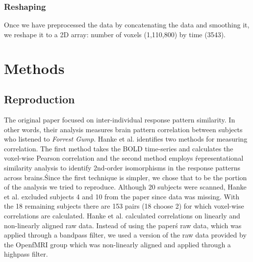 \documentclass[11pt]{article}
\begin{document}
\subsubsection{Reshaping}
Once we have preprocessed the data by concatenating the data and smoothing it,
we reshape it to a 2D array: number of voxels (1,110,800) by time (3543).

\section{Methods}

\subsection{Reproduction}

The original paper focused on inter-individual response pattern similarity. In
other words, their analysis measures brain pattern correlation between
subjects who listened to \emph{Forrest Gump}. Hanke et al. identifies two 
methods for measuring correlation. The first method takes the BOLD time-series 
and calculates the voxel-wise Pearson correlation and the second method employs
\'representational similarity analysis to identify 2nd-order isomorphisms in
the response patterns across brains.\' Since the first technique is simpler, we
chose that to be the portion of the analysis we tried to reproduce. Although
20 subjects were scanned, Hanke et al. excluded subjects 4 and 10 from the 
paper since data was missing. With the 18 remaining subjects there are 153 
pairs (18 choose 2) for which voxel-wise correlations are calculated. Hanke et 
al. calculated correlations on linearly and non-linearly aligned raw data. 
Instead of using the paper\'s raw data, which was applied through a bandpass 
filter, we used a version of the raw data provided by the OpenfMRI group which 
was non-linearly aligned and applied through a highpass filter.
\end{document}
